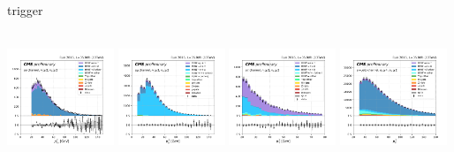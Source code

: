 \begin{frame}{}
    \begin{block}{\smaller \Pe trigger}
    \begin{center}
        \cee \qquad\qquad\qquad\quad \cem \qquad\qquad\qquad\quad \cet \qquad\qquad\qquad\quad \ceh \\
        \includegraphics[width=0.24\textwidth]{chapters/Analysis/sectionPlots/figures/kinematics_pickles/ee/2b/ee_2b_lepton2_pt.pdf}
        \includegraphics[width=0.24\textwidth]{chapters/Analysis/sectionPlots/figures/kinematics_pickles/emu2/2b/emu2_2b_lepton1_pt.pdf}
        \includegraphics[width=0.24\textwidth]{chapters/Analysis/sectionPlots/figures/kinematics_pickles/etau/2b/etau_2b_lepton2_pt.pdf}
        \includegraphics[width=0.24\textwidth]{chapters/Analysis/sectionPlots/figures/kinematics_pickles/e4j/2b/e4j_2b_lepton1_pt.pdf}
    \end{center}
    \end{block}
\end{frame}





